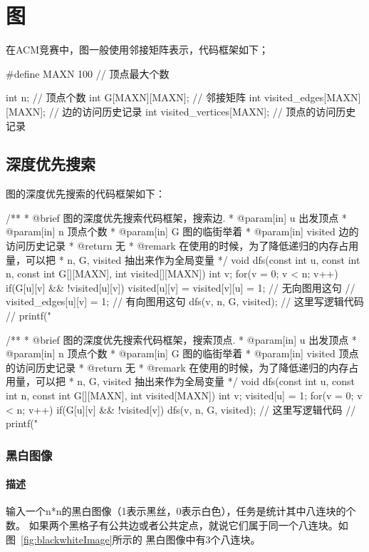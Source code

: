 \chapter{图}
在ACM竞赛中，图一般使用邻接矩阵表示，代码框架如下；

\begin{Codex}[label=graph.c]
#define MAXN 100  // 顶点最大个数

int n; // 顶点个数
int G[MAXN][MAXN]; // 邻接矩阵
int visited_edges[MAXN][MAXN]; // 边的访问历史记录
int visited_vertices[MAXN]; // 顶点的访问历史记录
\end{Codex}

\section{深度优先搜索} %
图的深度优先搜索的代码框架如下：

\begin{Codex}[label=graph.c]
/**
 * @brief 图的深度优先搜索代码框架，搜索边.
 * @param[in] u 出发顶点
 * @param[in] n 顶点个数
 * @param[in] G 图的临街举着
 * @param[in] visited 边的访问历史记录
 * @return 无
 * @remark 在使用的时候，为了降低递归的内存占用量，可以把
 * n, G, visited 抽出来作为全局变量
 */
void dfs(const int u, 
                const int n, const int G[][MAXN], int visited[][MAXN]) {
    int v;
    for(v = 0;  v < n; v++) if(G[u][v] && !visited[u][v]) {
        visited[u][v] = visited[v][u] = 1; // 无向图用这句
        // visited_edges[u][v] = 1; // 有向图用这句
        dfs(v, n, G, visited);
        // 这里写逻辑代码
        // printf("%
    }
}

/**
 * @brief 图的深度优先搜索代码框架，搜索顶点.
 * @param[in] u 出发顶点
 * @param[in] n 顶点个数
 * @param[in] G 图的临街举着
 * @param[in] visited 顶点的访问历史记录
 * @return 无
 * @remark 在使用的时候，为了降低递归的内存占用量，可以把
 * n, G, visited 抽出来作为全局变量
 */
void dfs(const int u, 
                const int n, const int G[][MAXN], int visited[MAXN]) {  
    int v;
    visited[u] = 1;
    for(v = 0;  v < n; v++) if(G[u][v] && !visited[v]) {
        dfs(v, n, G, visited);
        // 这里写逻辑代码
        // printf("%
    }
}
\end{Codex}

\subsection{黑白图像}

\subsubsection{描述}
输入一个n*n的黑白图像（1表示黑丝，0表示白色），任务是统计其中八连块的个数。
如果两个黑格子有公共边或者公共定点，就说它们属于同一个八连块。如图~\ref{fig:blackwhiteImage}所示的
黑白图像中有3个八连块。

